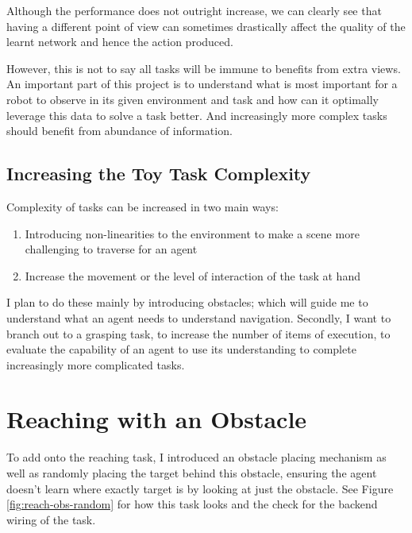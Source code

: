 Although the performance does not outright increase, we can clearly see that having a different point of view can sometimes drastically affect the quality of the learnt network and hence the action produced. \todo[color=purple]{}  

However, this is not to say all tasks will be immune to benefits from extra views. An important part of this project is to understand what is most important for a robot to observe in its given environment and task and how can it optimally leverage this data to solve a task better. And increasingly more complex tasks should benefit from abundance of information.

\subsection{Increasing the Toy Task Complexity}
Complexity of tasks can be increased in two main ways:
\begin{enumerate}
  \item Introducing non-linearities to the environment to make a scene more challenging to traverse for an agent
  \item Increase the movement or the level of interaction of the task at hand
\end{enumerate}
I plan to do these mainly by introducing obstacles; which will guide me to understand what an agent needs to understand navigation. Secondly, I want to branch out to a grasping task, to increase the number of items of execution, to evaluate the capability of an agent to use its understanding to complete increasingly more complicated tasks.

\section{Reaching with an Obstacle}
To add onto the reaching task, I introduced an obstacle placing mechanism as well as randomly placing the target behind this obstacle, ensuring the agent doesn't learn where exactly target is by looking at just the obstacle\todo[color=purple]. See Figure \ref{fig:reach-obs-random} for how this task looks and the check  for the backend wiring of the task.

